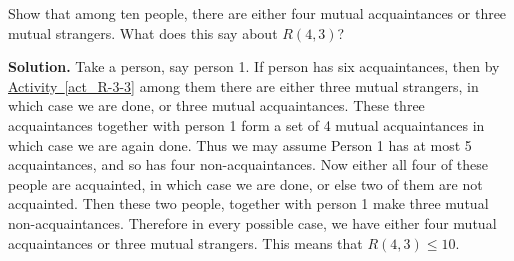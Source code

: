 \documentclass{book}
\begin{document}
\setcounter{project}{49}
\addtocounter{project}{-1}
\begin{activity}[]\label{activity-42}
\hypertarget{p-439}{}%
Show that among ten people, there are either four mutual acquaintances or three mutual strangers.  What does this say about \(R(4,3)\)?%
\par\smallskip%
\noindent\textbf{Solution.}\hypertarget{solution-47}{}\quad%
\hypertarget{p-440}{}%
Take a person, say person 1. If person has six acquaintances, then by \hyperref[act_R-3-3]{Activity~\ref{act_R-3-3}} among them there are either three mutual strangers, in which case we are done, or three mutual acquaintances. These three acquaintances together with person 1 form a set of 4 mutual acquaintances in which case we are again done. Thus we may assume Person 1 has at most 5 acquaintances, and so has four non-acquaintances. Now either all four of these people are acquainted, in which case we are done, or else two of them are not acquainted. Then these two people, together with person 1 make three mutual non-acquaintances. Therefore in every possible case, we have either four mutual acquaintances or three mutual strangers. This means that \(R(4,3) \le 10\).%
\end{activity}
\end{document}
